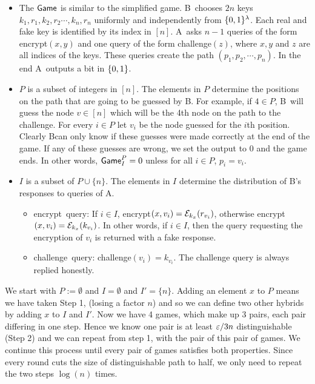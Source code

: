 \documentclass{article}
\def\B{{\sf B}}
\def\A{{\sf A}}
\def\E{{\cal E}}
\newcommand{\encrypt}{{\sf encrypt}}
\newcommand{\game}{{\sf Game}}
\newcommand{\dgg}[2]{\game_{#1}^{#2}}
\def\challenge{{\sf challenge}}
\begin{document}
\begin{itemize}
\item The $\game$ is similar to the simplified game. \B~chooses $2n$ keys $k_1,r_1,k_2,r_2\cdots,k_n,r_n$ uniformly and independently from $\{0,1\}^\lambda$. Each real and fake key is identified by its index in $[n]$. \A~asks $n-1$ queries of the form \encrypt$(x,y)$ and one query of the form \challenge$(z)$, where $x,y$ and $z$ are all indices of the keys. These queries create the path $(p_1,p_2,\cdots, p_n)$. In the end \A~outputs a bit in $\{0,1\}$.
 
\item $P$ is a subset of integers in $[n]$. The elements in $P$ determine the positions on the path that are going to be guessed by \B. For example, if $4\in P$, \B~will guess the node $v\in [n]$  which will be the 4th node on the path to the challenge. For every $i \in P$ let $v_i$ be the node guessed for the $i$th position. Clearly \B can only know if these guesses were made correctly at the end of the game. If any of these guesses are wrong, we set the output to $0$ and the game ends. In other words, $\dgg{I}{P}=0$ unless for all $i\in P$, $p_i=v_i$.

\item $I$ is a subset of $P\cup \{n\}$. The elements in $I$ determine the distribution of \B's responses to queries of \A.
\begin{itemize}
\item \encrypt~query: If $i\in I$, \encrypt$(x,v_i)=\E_{k_x}(r_{v_i})$, otherwise \encrypt$(x,v_i)=\E_{k_x}(k_{v_i})$. In other words, if $i\in I$, then the query requesting the encryption of $v_i$ is returned with a fake response.
\item \challenge~query: \challenge$(v_i)=k_{v_i}$. The challenge query is always replied honestly. 
\end{itemize}
\end{itemize}

We start with $P:=\emptyset$ and $I=\emptyset$ and $I'=\{n\}$. Adding an element $x$ to $P$ means we have taken Step 1, (losing a factor $n$) and so we can define two other hybrids by adding $x$ to $I$ and $I'$. Now we have 4 games, which make up 3 pairs, each pair differing in one step. Hence we know one pair is at least $\varepsilon/3n$ distinguishable (Step 2) and we can repeat from step 1, with the pair of this pair of games. We continue this process until every pair of games satisfies both properties. Since every round cuts the size of distinguishable path to half, we only need to repeat the two steps $\log(n)$ times. 
\end{document}

